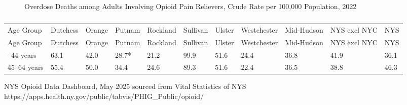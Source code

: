 \documentclass[
  english,
  letterpaper,
]{report}
\begin{document}
\begin{figure}


\caption{\label{fig-18to64-opioid-pain-crude}Overdose Deaths among
Adults Involving Opioid Pain Relievers, Crude Rate per 100,000
Population, 2022}

\end{figure}%

\begin{longtable}[]{@{}lllllllllll@{}}

\caption{\label{tbl-18to64-opioid-pain-crude}Overdose Deaths among
Adults Involving Opioid Pain Relievers, Crude Rate per 100,000
Population, 2022}

\tabularnewline

\caption{}\label{T_ec3a0}\tabularnewline
\toprule\noalign{}
Age Group & Dutchess & Orange & Putnam & Rockland & Sullivan & Ulster &
Westchester & Mid-Hudson & NYS excl NYC & NYS \\
\midrule\noalign{}
\endfirsthead
\toprule\noalign{}
Age Group & Dutchess & Orange & Putnam & Rockland & Sullivan & Ulster &
Westchester & Mid-Hudson & NYS excl NYC & NYS \\
\midrule\noalign{}
\endhead
\bottomrule\noalign{}
\endlastfoot
18--44 years & 63.1 & 42.0 & 28.7* & 21.2 & 99.9 & 51.6 & 24.4 & 36.8 &
41.9 & 36.1 \\
45--64 years & 55.4 & 50.0 & 34.4 & 24.6 & 89.3 & 51.6 & 22.4 & 36.5 &
38.8 & 46.3 \\

\end{longtable}

\begin{tcolorbox}[enhanced jigsaw, breakable, leftrule=.75mm, title=\textcolor{quarto-callout-note-color}{\faInfo}\hspace{0.5em}{Source}, bottomrule=.15mm, opacityback=0, left=2mm, colback=white, bottomtitle=1mm, coltitle=black, colbacktitle=quarto-callout-note-color!10!white, colframe=quarto-callout-note-color-frame, opacitybacktitle=0.6, toptitle=1mm, titlerule=0mm, arc=.35mm, rightrule=.15mm, toprule=.15mm]

NYS Opioid Data Dashboard, May 2025 sourced from Vital Statistics of NYS
https://apps.health.ny.gov/public/tabvis/PHIG\_Public/opioid/

\end{tcolorbox}
\end{document}
